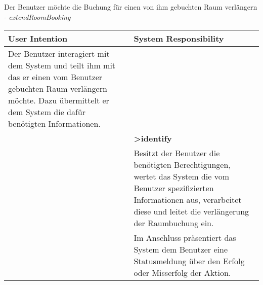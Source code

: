 \begin{table}[h]
	Der Benutzer möchte die Buchung für einen von ihm gebuchten Raum verlängern - \textit{extendRoomBooking}\\
	\begin{tabularx}{\textwidth}{|X|X|}
	\rowcolor{heading} \textbf{User Intention} & \textbf{System Responsibility}\\ \hline
	Der Benutzer interagiert mit dem System und teilt ihm mit das er einen vom Benutzer gebuchten Raum verlängern möchte. Dazu übermittelt er dem System die dafür benötigten Informationen. & \\  \hline
	 & \textbf{>identify} \\ \hline
	 & Besitzt der Benutzer die benötigten Berechtigungen, wertet das System die vom Benutzer spezifizierten Informationen aus, verarbeitet diese und leitet die verlängerung der Raumbuchung ein.\\ \hline
	 & Im Anschluss präsentiert das System dem Benutzer eine Statusmeldung über den Erfolg oder Misserfolg der Aktion.\\ \hline
	\end{tabularx}
\end{table}
